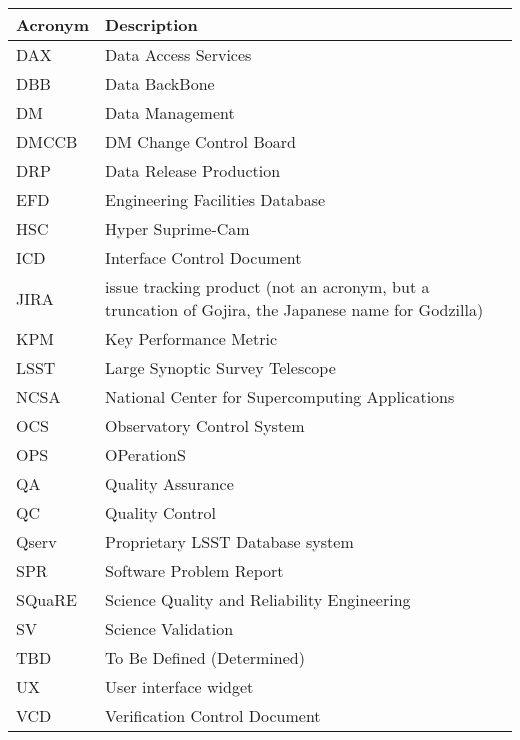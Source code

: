 \addtocounter{table}{-1}
\begin{longtable}{|l|p{}|}\hline 
\textbf{Acronym} & \textbf{Description}  \\\hline
DAX&Data Access Services \\\hline
DBB&Data BackBone \\\hline
DM&Data Management \\\hline
DMCCB&DM Change Control Board \\\hline
DRP&Data Release Production \\\hline
EFD&Engineering Facilities Database \\\hline
HSC&Hyper Suprime-Cam \\\hline
ICD&Interface Control Document \\\hline
JIRA&issue tracking product (not an acronym, but a truncation of Gojira, the Japanese name for Godzilla) \\\hline
KPM&Key Performance Metric \\\hline
LSST&Large Synoptic Survey Telescope \\\hline
NCSA&National Center for Supercomputing Applications \\\hline
OCS&Observatory Control System \\\hline
OPS&OPerationS \\\hline
QA&Quality Assurance \\\hline
QC&Quality Control \\\hline
Qserv&Proprietary LSST Database system \\\hline
SPR&Software Problem Report \\\hline
SQuaRE&Science Quality and Reliability Engineering \\\hline
SV&Science Validation \\\hline
TBD&To Be Defined (Determined) \\\hline
UX&User interface widget \\\hline
VCD&Verification Control Document \\\hline
\end{longtable} 
